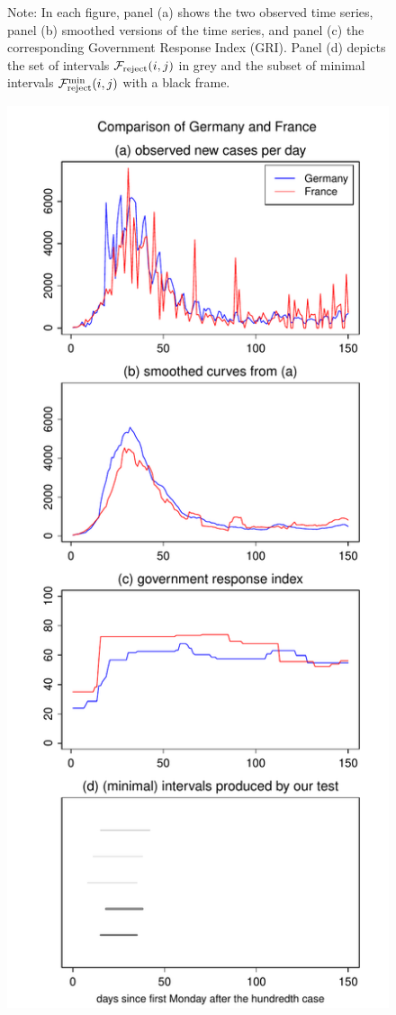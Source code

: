 \documentclass[a4paper,12pt]{article}
\numberwithin{equation}{section}
\begin{document}
\begin{figure}[p!]
\caption*{Note: In each figure, panel (a) shows the two observed time series, panel (b) smoothed versions of the time series, and panel (c) the corresponding Government Response Index (GRI). Panel (d) depicts the set of intervals $\mathcal{F}_{\text{reject}}(i,j)$ in grey and the subset of minimal intervals $\mathcal{F}_{\text{reject}}^{\text{min}}(i,j)$ with a black frame.}
\end{figure}


\begin{figure}[p!]
\begin{minipage}[t]{0.49\textwidth}
\includegraphics[width=\textwidth]{plots/DEU_vs_FRA}

\end{minipage}
\end{figure}
\end{document}
